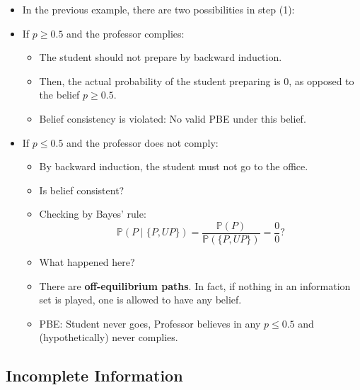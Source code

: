 \documentclass[notitlepage]{article}
\begin{document}
\begin{itemize}
    \item In the previous example, there are two possibilities in step (1):
    \item If \(p \ge 0.5\) and the professor complies:
    \begin{itemize}
        \item The student should not prepare by backward induction.
        \item Then, the actual probability of the student preparing is 0, as opposed to the belief \(p \ge 0.5\).
        \item Belief consistency is violated: No valid PBE under this belief.
    \end{itemize}
    \item If \(p \le 0.5\) and the professor does not comply:
    \begin{itemize}
        \item By backward induction, the student must not go to the office.
        \item Is belief consistent?
        \item Checking by Bayes' rule:
        \[
        \mathbb{P}(P \mid \{P, UP\}) = \frac{\mathbb{P}(P)}{\mathbb{P}(\{P, UP\})} = \frac{0}{0}?
        \]
        \item What happened here?
        \item There are \textbf{off-equilibrium paths}. In fact, if nothing in an information set is played, one is allowed to have any belief.
        \item PBE: Student never goes, Professor believes in any \(p \le 0.5\) and (hypothetically) never complies.
    \end{itemize}
    
\end{itemize}

\subsection{Incomplete Information}
\end{document}
